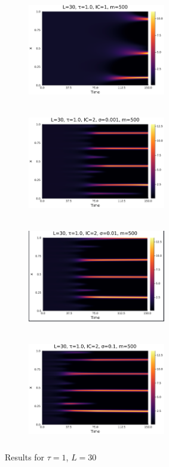 \documentclass[12pt,a4paper]{article}
\begin{document}
\begin{figure}[H]
    \centering
    \begin{subfigure}[b]{0.45\linewidth}
        \centering
        \includegraphics[width=6cm,height = 4.5cm]{l30t1ic1.png}
        \caption{}
        \label{}
    \end{subfigure}
    \hfill
    \begin{subfigure}[b]{0.45\linewidth}
        \centering
        \includegraphics[width=6cm,height = 4.5cm]{l30t1ic2s1e3.png}
        \caption{}
        \label{}
    \end{subfigure}
    \hfill
    \begin{subfigure}[b]{0.45\linewidth}
        \centering
        \includegraphics[width=6cm,height = 4.5cm]{l30t1ic2s1e2.png}
        \caption{}
        \label{}
    \end{subfigure}
    \hfill
    \begin{subfigure}[b]{0.45\linewidth}
        \centering
        \includegraphics[width=6cm,height = 4.5cm]{l30t1ic2s1e1.png}
        \caption{}
        \label{}
    \end{subfigure}
    \caption{Results for $\tau=1$, $L=30$}
    \label{}
\end{figure}
\end{document}
